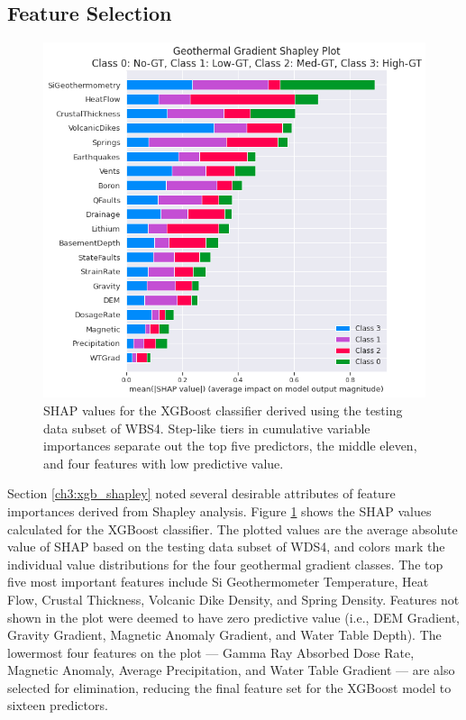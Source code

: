 \subsection{Feature Selection}\label{ch5:xgb_feature_selection}
\begin{figure}[htp]
\centering
\includegraphics[width=\textwidth]{templates/images/Figure-Shapley.png}
\caption[XGBoost SHAP values]{SHAP values for the XGBoost classifier derived using the testing data subset of WBS4. Step-like tiers in cumulative variable importances separate out the top five predictors, the middle eleven, and four features with low predictive value.}
\label{fig:xgb_shap_global}
\end{figure}
Section \ref{ch3:xgb_shapley} noted several desirable attributes of feature importances derived from Shapley analysis. Figure \ref{fig:xgb_shap_global} shows the SHAP values calculated for the XGBoost classifier. The plotted values are the average absolute value of SHAP based on the testing data subset of WDS4, and colors mark the individual value distributions for the four geothermal gradient classes. The top five most important features include Si Geothermometer Temperature, Heat Flow, Crustal Thickness, Volcanic Dike Density, and Spring Density.  Features not shown in the plot were deemed to have zero predictive value (i.e., DEM Gradient, Gravity Gradient, Magnetic Anomaly Gradient, and Water Table Depth). The lowermost four features on the plot --- Gamma Ray Absorbed Dose Rate, Magnetic Anomaly, Average Precipitation, and Water Table Gradient --- are also selected for elimination, reducing the final feature set for the XGBoost model to sixteen predictors.

